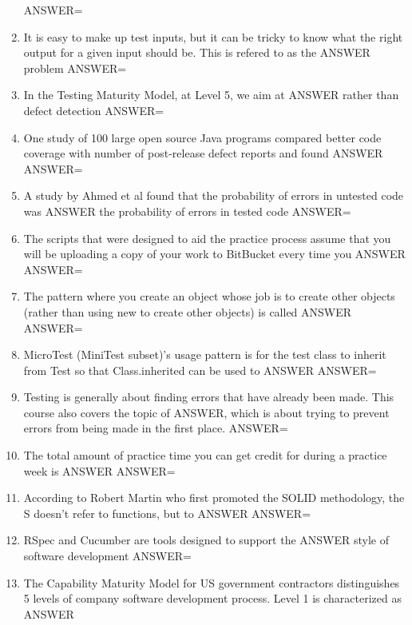\documentclass{exam}
\begin{document}
\begin{enumerate}
ANSWER=
\item It is easy to make up test inputs, but it can be tricky to know what the right output for a given input should be.  This is refered to as the ANSWER problem\newline
ANSWER=
\item In the Testing Maturity Model, at Level 5, we aim at ANSWER rather than defect detection\newline
ANSWER=
\item One study of 100 large open source Java programs compared better code coverage with number of post-release defect reports and found ANSWER\newline
ANSWER=
\item A study by Ahmed et al found that the probability of errors in untested code was ANSWER the probability of errors in tested code\newline
ANSWER=
\item The scripts that were designed to aid the practice process assume that you will be uploading a copy of your work to BitBucket every time you ANSWER\newline
ANSWER=
\item The pattern where you create an object whose job is to create other objects (rather than using new to create other objects) is called ANSWER\newline
ANSWER=
\item MicroTest (MiniTest subset)'s usage pattern is for the test class to inherit from Test so that Class.inherited can be used to ANSWER\newline
ANSWER=
\item Testing is generally about finding errors that have already been made.  This course also covers the topic of ANSWER, which is about trying to prevent errors from being made in the first place.\newline
ANSWER=
\item The total amount of practice time you can get credit for during a practice week is ANSWER\newline
ANSWER=
\item According to Robert Martin who first promoted the SOLID methodology, the S doesn't refer to functions, but to ANSWER\newline
ANSWER=
\item RSpec and Cucumber are tools designed to support the ANSWER style of software development\newline
ANSWER=
\item The Capability Maturity Model for US government contractors distinguishes 5 levels of company software development process.  Level 1 is characterized as ANSWER\newline

\end{enumerate}
\end{document}
